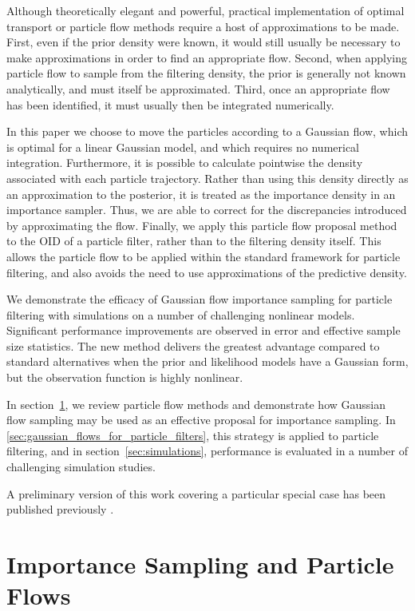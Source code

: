 \documentclass{article}
\begin{document}
Although theoretically elegant and powerful, practical implementation of optimal transport or particle flow methods require a host of approximations to be made. First, even if the prior density were known, it would still usually be necessary to make approximations in order to find an appropriate flow. Second, when applying particle flow to sample from the filtering density, the prior is generally not known analytically, and must itself be approximated. Third, once an appropriate flow has been identified, it must usually then be integrated numerically.

In this paper we choose to move the particles according to a Gaussian flow, which is optimal for a linear Gaussian model, and which requires no numerical integration. Furthermore, it is possible to calculate pointwise the density associated with each particle trajectory. Rather than using this density directly as an approximation to the posterior, it is treated as the importance density in an importance sampler. Thus, we are able to correct for the discrepancies introduced by approximating the flow. Finally, we apply this particle flow proposal method to the OID of a particle filter, rather than to the filtering density itself. This allows the particle flow to be applied within the standard framework for particle filtering, and also avoids the need to use approximations of the predictive density.

We demonstrate the efficacy of Gaussian flow importance sampling for particle filtering with simulations on a number of challenging nonlinear models. Significant performance improvements are observed in error and effective sample size statistics. The new method delivers the greatest advantage compared to standard alternatives when the prior and likelihood models have a Gaussian form, but the observation function is highly nonlinear.

In section~\ref{sec:gaussian_flows}, we review particle flow methods and demonstrate how Gaussian flow sampling may be used as an effective proposal for importance sampling. In \ref{sec:gaussian_flows_for_particle_filters}, this strategy is applied to particle filtering, and in section~\ref{sec:simulations}, performance is evaluated in a number of challenging simulation studies.

A preliminary version of this work covering a particular special case has been published previously \cite{Bunch2013a}.


\section{Importance Sampling and Particle Flows} \label{sec:gaussian_flows}
\end{document}
